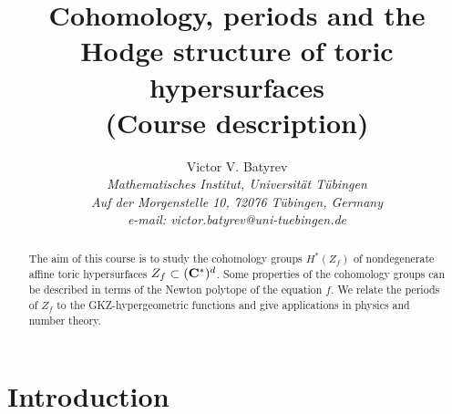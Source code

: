 \setlength{\textheight}{9in}
\addtolength{\textwidth}{0.5in}
\setlength{\oddsidemargin}{0in}
\setlength{\evensidemargin}{0in}
\addtolength{\topmargin}{-.75in}
\renewcommand{\thefootnote}{}
\renewcommand{\baselinestretch}{1.0}

\newcommand{\no}{\noindent}
\def\C{{\Bbb C}}
\def\H{{\Bbb H}}
\def\N{{\Bbb N}}
\def\Q{{\Bbb Q}}
\def\R{{\Bbb R}}
\def\P{{\Bbb P}}
\def\Z{{\Bbb Z}}
\def\A{{\Bbb A}}
\def\G{{\Bbb G}}
\def\e{{\varepsilon}}

\newtheorem{prop}{Proposition}[section]
\newtheorem{dfn}[prop]{Definition}
\newtheorem{theo}[prop]{Theorem}
\newtheorem{conj}[prop]{Conjecture}
\newtheorem{rem}[prop]{Remark}
\newtheorem{coro}[prop]{Corollary}
\newtheorem{lem}[prop]{Lemma}
\newtheorem{exam}[prop]{Example}
\newtheorem{ques}[prop]{Question}
\newtheorem{prob}[prop]{Problem}

\title{\sc Cohomology, periods and the Hodge structure of 
toric hypersurfaces \\
{\small  (Course description) }} 

\author{{\sc Victor V. Batyrev} \\
\small  {\em Mathematisches Institut, Universit\"at T\"ubingen}   \\
\small  {\em Auf der Morgenstelle 10,  72076  T\"ubingen, Germany}  \\
\small  {\em e-mail: victor.batyrev@uni-tuebingen.de} \\
 }




\date{}

\maketitle

\begin{abstract}
The aim of this course is to study the cohomology groups $H^*(Z_f)$
of nondegenerate affine toric hypersurfaces $Z_f \subset ({\bf C}^*)^d$.
Some properties of the cohomology  groups  
can be described in terms of the 
Newton polytope of the equation $f$. 
We relate the  periods of $Z_f $ to the  GKZ-hypergeometric functions and 
give applications in physics and number theory. 
\end{abstract}



\section{Introduction} 

